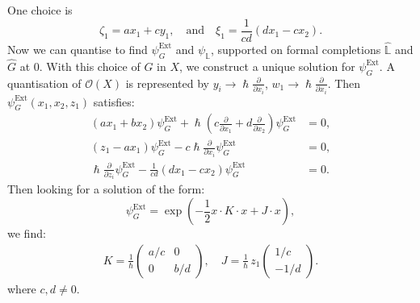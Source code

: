     One choice is 
    \[\zeta_1 = a x_1 + c y_1, \quad  \text{and} \quad  \xi_1 = \frac{1}{cd} \left( d x_1 - c x_2 \right) .\]
    Now we can quantise to find \( \psi_G^{\text{Ext}}\) and \( \psi_{\mathbb{L}}\), supported on formal completions \( \widehat{\mathbb{L}}\) and \( \widehat{G}\) at \(0\). With this choice of \(G\) in \(X\), we construct a unique solution for \(\psi_G^{\text{Ext}}\).
    A quantisation of \(\mathcal{O}(X)\) is represented by \(y_i \rightarrow \hslash \frac{\partial}{\partial x_i}\), \( w_1 \rightarrow \hslash \frac{\partial}{\partial x_i}\). Then \( \psi_G^{\text{Ext}}(x_1,x_2,z_1)\) satisfies: 
    \begin{align*}
       (a x_1 + b x_2) \psi_G^{\text{Ext}} + \hslash \left( c \frac{\partial}{\partial x_1 } +  d \frac{\partial}{\partial x_2} \right) \psi_G^{\text{Ext}} & = 0, \\
       ( z_1 - a x_1 ) \psi_G^{\text{Ext}}  - c \hslash \frac{\partial}{\partial x_i} \psi_G^{\text{Ext}} &= 0, \\ 
       \hslash \frac{\partial}{\partial z_i} \psi_G^{\text{Ext}} - \frac{1}{c d} ( d x_1 - c x_2) \psi_G^{\text{Ext}} &= 0.
    \end{align*}
    Then looking for a solution of the form:
    \[ \psi_G^{\text{Ext}} = \exp\left( -\frac{1}{2} x \cdot K \cdot x  + J  \cdot x\right),\]
    we find: 
    \begin{align*}
        K = \frac{1}{\hslash} \left(\begin{array}{cc}
            a/c & 0 \\
            0 & b/d
        \end{array}\right), \quad J = \frac{1}{\hslash} \,  z_1 \left( \begin{array}{c}
            1/c \\
            -1/d
        \end{array}\right).
    \end{align*}
    where \( c , d \neq 0\).
    

